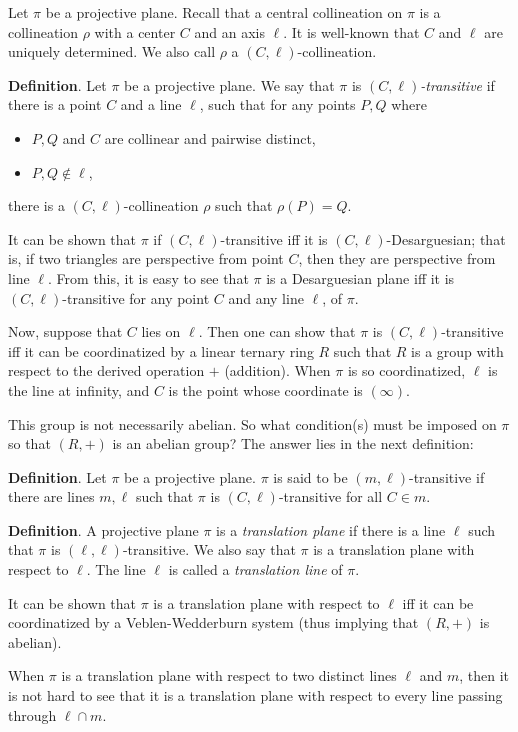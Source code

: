\documentclass[12pt]{article}
\begin{document}
Let $\pi$ be a projective plane.  Recall that a central collineation on $\pi$ is a collineation $\rho$ with a center $C$ and an axis $\ell$.  It is well-known that $C$ and $\ell$ are uniquely determined.  We also call $\rho$ a $(C,\ell)$-collineation.

\textbf{Definition}.  Let $\pi$ be a projective plane.  We say that $\pi$ is \emph{$(C,\ell)$-transitive} if there is a point $C$ and a line $\ell$, such that for any points $P,Q$ where
\begin{itemize}
\item $P,Q$ and $C$ are collinear and pairwise distinct,
\item $P,Q\notin \ell$,
\end{itemize}
there is a $(C,\ell)$-collineation $\rho$ such that $\rho(P)=Q$.

It can be shown that $\pi$ if $(C,\ell)$-transitive iff it is $(C,\ell)$-Desarguesian; that is, if two triangles are perspective from point $C$, then they are perspective from line $\ell$.  From this, it is easy to see that $\pi$ is a Desarguesian plane iff it is $(C,\ell)$-transitive for any point $C$ and any line $\ell$, of $\pi$.

Now, suppose that $C$ lies on $\ell$.  Then one can show that $\pi$ is $(C,\ell)$-transitive iff it can be coordinatized by a linear ternary ring $R$ such that $R$ is a group with respect to the derived operation $+$ (addition).  When $\pi$ is so coordinatized, $\ell$ is the line at infinity, and $C$ is the point whose coordinate is $(\infty)$.

This group is not necessarily abelian.  So what condition(s) must be imposed on $\pi$ so that $(R,+)$ is an abelian group?  The answer lies in the next definition:

\textbf{Definition}.  Let $\pi$ be a projective plane.  $\pi$ is said to be $(m,\ell)$-transitive if there are lines $m,\ell$ such that $\pi$ is $(C,\ell)$-transitive for all $C\in m$.

\textbf{Definition}.  A projective plane $\pi$ is a \emph{translation plane} if there is a line $\ell$ such that $\pi$ is $(\ell,\ell)$-transitive.  We also say that $\pi$ is a translation plane with respect to $\ell$.  The line $\ell$ is called a \emph{translation line} of $\pi$.

It can be shown that $\pi$ is a translation plane with respect to $\ell$ iff it can be coordinatized by a Veblen-Wedderburn system (thus implying that $(R,+)$ is abelian).

When $\pi$ is a translation plane with respect to two distinct lines $\ell$ and $m$, then it is not hard to see that it is a translation plane with respect to every line passing through $\ell\cap m$.
\end{document}
